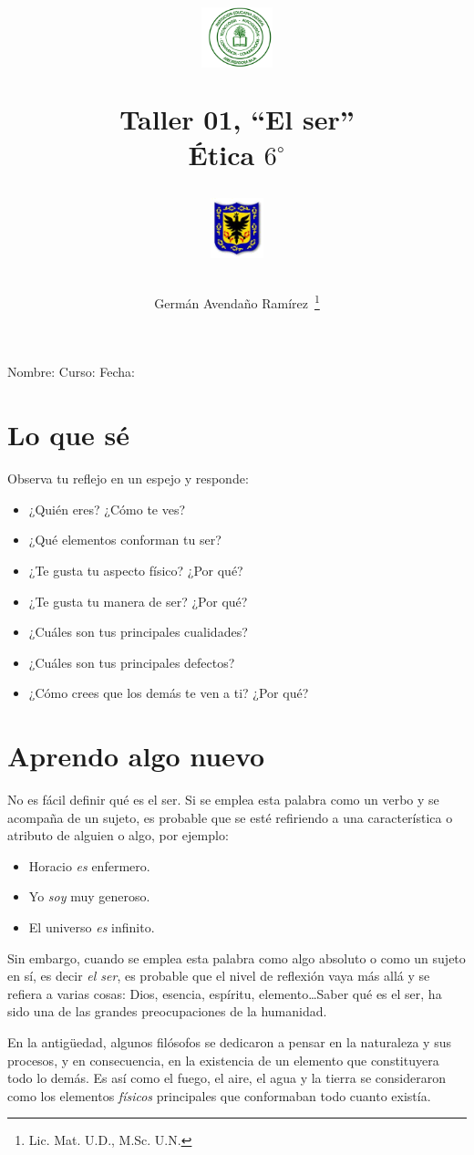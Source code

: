 \documentclass[twoside]{article}
\author{Germ\'an Avenda\~no Ram\'irez~\thanks{Lic. Mat. U.D., M.Sc. U.N.}}
\title{\begin{minipage}{.2\textwidth}
\includegraphics[height=1.75cm]{Images/logo-colegio.png}\end{minipage}
\begin{minipage}{.55\textwidth}
\begin{center}
Taller 01, ``El ser''\\
Ética $6^{\circ}$
\end{center}
\end{minipage}\hfill
\begin{minipage}{.2\textwidth}
\includegraphics[height=1.75cm]{Images/logo-sed.png} 
\end{minipage}}
\date{}
\begin{document}
\maketitle
Nombre: \hrulefill Curso: \underline{\hspace*{44pt}} Fecha: \underline{\hspace*{2.5cm}}

\section*{Lo que sé}
Observa tu reflejo en un espejo y responde:
\begin{itemize}
\item ¿Quién eres? ¿Cómo te ves?
\item ¿Qué elementos conforman tu ser?
\item ¿Te gusta tu aspecto físico? ¿Por qué?
\item ¿Te gusta tu manera de ser? ¿Por qué?
\item ¿Cuáles son tus principales cualidades?
\item ¿Cuáles son tus principales defectos?
\item ¿Cómo crees que los demás te ven a ti? ¿Por qué?
\end{itemize}
\section*{Aprendo algo nuevo}
No es fácil definir qué es el ser. Si se emplea esta palabra como un verbo y se acompaña de un sujeto, es probable que se esté refiriendo a una característica o atributo de alguien o algo, por ejemplo:
\begin{itemize}
\item Horacio \emph{es} enfermero.
\item Yo \emph{soy} muy generoso.
\item El universo \emph{es} infinito.
\end{itemize}
Sin embargo, cuando se emplea esta palabra como algo
absoluto o como un sujeto en sí, es decir \emph{el ser}, es probable que el nivel de reflexión vaya más allá y se refiera a varias cosas: Dios, esencia, espíritu, elemento\ldots Saber qué es el ser, ha sido una de las grandes preocupaciones de la humanidad.

En la antigüedad, algunos filósofos se dedicaron a pensar en la naturaleza y sus procesos, y en consecuencia, en la existencia de un elemento que constituyera todo lo demás.
Es así como el fuego, el aire, el agua y la tierra se consideraron como los elementos \emph{físicos} principales que conformaban todo cuanto existía.
\end{document}
